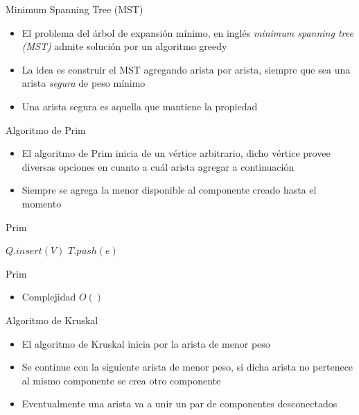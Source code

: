 \documentclass[]{beamer}
\begin{document}
\begin{frame}{Minimum Spanning Tree (MST)}
  \begin{itemize}
    \item El problema del \'arbol de expansi\'on m\'inimo, en ingl\'es \textit{minimum spanning tree (MST)} admite soluci\'on por un algoritmo greedy
      \pause
    \item La idea es construir el MST agregando arista por arista, siempre que sea una arista \textit{segura} de peso m\'inimo
      \pause
    \item Una arista segura es aquella que mantiene la propiedad
  \end{itemize}
\end{frame}

\begin{frame}{Algoritmo de Prim}
  \begin{itemize}
    \item El algoritmo de Prim inicia de un v\'ertice arbitrario, dicho v\'ertice provee diversas opciones en cuanto a cu\'al arista agregar a continuaci\'on
      \pause
    \item Siempre se agrega la menor disponible al componente creado hasta el momento
  \end{itemize}
\end{frame}

\begin{frame}{Prim}
  \begin{algorithm}[H]
    { $ Q.insert(V) $ }
    {
      {
        {$ T.push(e)  $}
      }
    }
  \end{algorithm}
\end{frame}

\begin{frame}{Prim}
  \begin{itemize}
    \item Complejidad $O()$
  \end{itemize}
\end{frame}

\begin{frame}{Algoritmo de Kruskal}
  \begin{itemize}
    \item El algoritmo de Kruskal inicia por la arista de menor peso
      \pause
    \item Se continue con la siguiente arista de menor peso, si dicha arista no pertenece al mismo componente se crea otro componente
      \pause
    \item Eventualmente una arista va a unir un par de componentes desconectados
  \end{itemize}
\end{frame}
\end{document}
